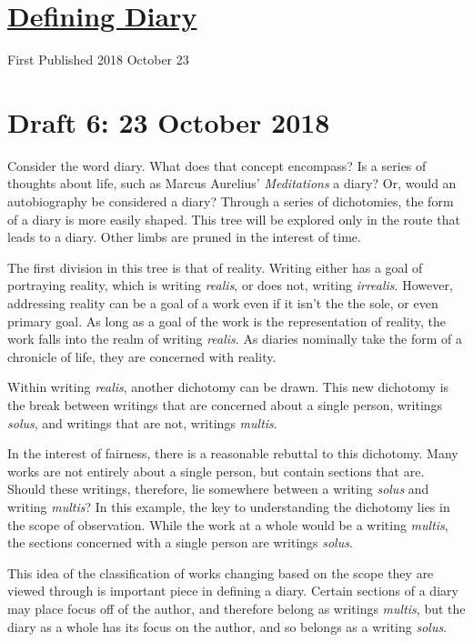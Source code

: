 \documentclass[12pt]{article}[titlepage]
\newcommand{\1}{\={a}}
\newcommand{\2}{\={e}}
\newcommand{\3}{\={\i}}
\newcommand{\4}{\=o}
\newcommand{\5}{\=u}
\newcommand{\6}{\={A}}
\renewcommand{\,}{\textsuperscript{,}}
\begin{document}
\doublespacing
\section{\href{defining-diary.html}{Defining Diary}}
First Published 2018 October 23
\section{Draft 6: 23 October 2018}
Consider the word diary.
What does that concept encompass?
Is a series of thoughts about life, such as Marcus Aurelius' \textit{Meditations} a diary?
Or, would an autobiography be considered a diary?
Through a series of dichotomies, the form of a diary is more easily shaped. 
This tree will be explored only in the route that leads to a diary.
Other limbs are pruned in the interest of time.

The first division in this tree is that of reality.
Writing either has a goal of portraying reality, which is writing \textit{realis}, or does not, writing \textit{irrealis}.
However, addressing reality can be a goal of a work even if it isn't the the sole, or even primary goal.
As long as a goal of the work is the representation of reality, the work falls into the realm of writing \textit{realis}.
As diaries nominally take the form of a chronicle of life, they are concerned with reality.

Within writing \textit{realis}, another dichotomy can be drawn.
This new dichotomy is the break between writings that are concerned about a single person, writings \textit{solus}, and writings that are not, writings \textit{multis}.

In the interest of fairness, there is a reasonable rebuttal to this dichotomy.
Many works are not entirely about a single person, but contain sections that are.
Should these writings, therefore, lie somewhere between a writing \textit{solus} and writing \textit{multis}?
In this example, the key to understanding the dichotomy lies in the scope of observation.
While the work at a whole would be a writing \textit{multis}, the sections concerned with a single person are writings \textit{solus}.

This idea of the classification of works changing based on the scope they are viewed through is important piece in defining a diary.
Certain sections of a diary may place focus off of the author, and therefore belong as writings \textit{multis}, but the diary as a whole has its focus on the author, and so belongs as a writing \textit{solus}.
\end{document}
